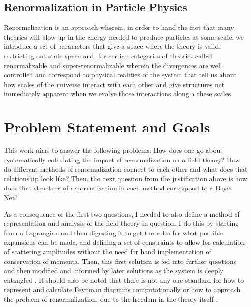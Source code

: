 \documentclass{article}
\begin{document}
\subsection{Renormalization in Particle Physics}
Renormalization is an approach wherein, in order to hand the fact that many theories will blow up in the energy needed to produce particles at some scale, we introduce a set of parameters that give a space where the theory is valid, restricting out state space and, for certian categories of theories called renormalizable and super-renormalizable wherein the divergences are well controlled and correspond to physical realities of the system that tell us about how scales of the universe interact with each other and give structures not immediately apparent when we evolve those interactions along a these scales. 

\section{Problem Statement and Goals}
\hspace{0.5 cm} This work aims to answer the following problems: How does one go about systematically calculating the impact of renormalization on a field theory? How do different methods of renormalization connect to each other and what does that relationship look like?
Then, the next question from the justification above is how does that structure of renormalization in each method correspond to a Bayes Net?

\hspace{0.5 cm} As a consequence of the first two questions, I needed to also define a method of representation and analysis of the field theory in question. 
I do this by starting from a Lagrangian and then digesting it to get the rules for what possible expansions can be made, and defining a set of constraints to allow for calculation of scattering amplitudes without the need for hand implementation of conservation of momenta. 
Then, this first solution is fed into further questions and then modified and informed by later solutions as the system is deeply entangled \cite{PS}. 
It should also be noted that there is not any one standard for how to represent and calculate Feynman diagrams computationally  \cite{Harlander1999} \cite{2009} \cite{Hodeges1990} \cite{TODOROV1971} \cite{BILENKY1974} or how to approach the problem of renormalization, due to the freedom in the theory itself \cite{Myers1996}\cite{Hansenfratz2019}\cite{Bednayakov2016} \cite{Carfora2010} 
\cite{Fabinao2022} \cite{Binosi2020}\cite{Sonoda2021}\cite{Aharony2019} \cite{Alekseev2005}. 
\end{document}
